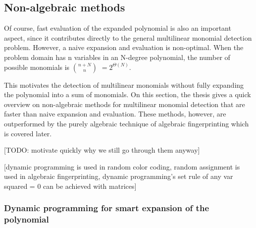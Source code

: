 \begin{problem}
\end{problem}



\subsection{Non-algebraic methods}

Of course, fast evaluation of the expanded polynomial is also an important aspect, since it contributes 
directly to the general multilinear monomial detection problem. However, a naive expansion and evaluation is non-optimal.
When the problem domain has n variables in an N-degree polynomial, the number of possible monomials is \(\binom{n+N}{n}\) $= 2^{\Theta(N)}$.\nl

This motivates the detection of multilinear monomials without fully expanding the polynomial into a sum of monomials. 
On this section, the thesis gives a quick overview on non-algebraic methods for 
multilinear monomial detection that are faster than naive expansion and evaluation. These methods, however, are 
outperformed by the purely algebraic technique of algebraic fingerprinting which is covered later. 

[TODO: motivate quickly why we still go through them anyway] 

[dynamic programming is used in random color coding, 
random assignment is used in algebraic fingerprinting,
dynamic programming's set rule of any var squared = 0 can be achieved with matrices]

\subsubsection{Dynamic programming for smart expansion of the polynomial}

